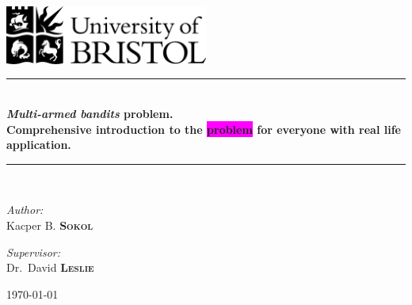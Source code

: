 \documentclass[12pt, a4paper, pdflatex]{report}
\newcommand{\HRule}{\rule{\linewidth}{0.5mm}}
\begin{document}
\begin{titlepage}
\begin{center}
\includegraphics[width=0.5\textwidth]{graphics/UOB-logo.png}~\\[4cm] %



\HRule \\[0.4cm]
{ \huge \bfseries \emph{Multi-armed bandits} problem.\\
	Comprehensive introduction to the \colorbox{magenta}{problem} for everyone with real life application. \\[0.4cm] }
\HRule \\[1.5cm]

\begin{minipage}{0.4\textwidth}
\begin{flushleft} \large
\emph{Author:}\\
Kacper B. \textsc{\textbf{Sokol}}
\end{flushleft}
\end{minipage}
\begin{minipage}{0.4\textwidth}
\begin{flushright} \large
\emph{Supervisor:} \\
Dr.~David \textsc{\textbf{Leslie}}
\end{flushright}
\end{minipage}

\vfill

{\large \today}
\end{center}
\end{titlepage}

\end{document}

